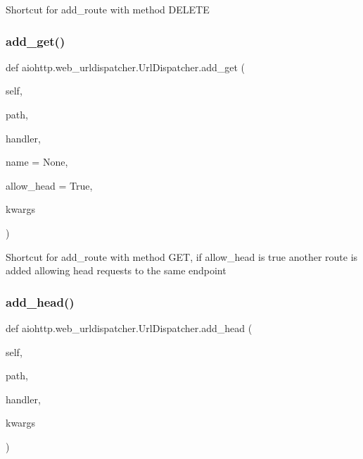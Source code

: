 \begin{DoxyVerb}Shortcut for add_route with method DELETE
\end{DoxyVerb}
 \mbox{\label{classaiohttp_1_1web__urldispatcher_1_1_url_dispatcher_abf5734aafaab163d20b158b6ecdc8d30}} 
\subsubsection{\texorpdfstring{add\+\_\+get()}{add\_get()}}
{\footnotesize\ttfamily def aiohttp.\+web\+\_\+urldispatcher.\+Url\+Dispatcher.\+add\+\_\+get (\begin{DoxyParamCaption}\item[{}]{self,  }\item[{}]{path,  }\item[{}]{handler,  }\item[{}]{name = {\ttfamily None},  }\item[{}]{allow\+\_\+head = {\ttfamily True},  }\item[{}]{kwargs }\end{DoxyParamCaption})}

\begin{DoxyVerb}Shortcut for add_route with method GET, if allow_head is true another
route is added allowing head requests to the same endpoint
\end{DoxyVerb}
 \mbox{\label{classaiohttp_1_1web__urldispatcher_1_1_url_dispatcher_a41bfa58768e2eaa444f528e299f9a492}} 
\subsubsection{\texorpdfstring{add\+\_\+head()}{add\_head()}}
{\footnotesize\ttfamily def aiohttp.\+web\+\_\+urldispatcher.\+Url\+Dispatcher.\+add\+\_\+head (\begin{DoxyParamCaption}\item[{}]{self,  }\item[{}]{path,  }\item[{}]{handler,  }\item[{}]{kwargs }\end{DoxyParamCaption})}

